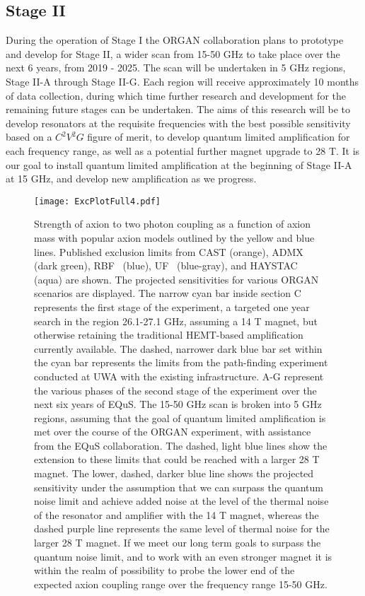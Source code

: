 \documentclass[preprint]{elsarticle}
\begin{document}
\subsection*{Stage II}
During the operation of Stage I the ORGAN collaboration plans to prototype and develop for Stage II, a wider scan from 15-50 GHz to take place over the next 6 years, from 2019 - 2025. The scan will be undertaken in 5 GHz regions, Stage II-A through Stage II-G. Each region will receive approximately 10 months of data collection, during which time further research and development for the remaining future stages can be undertaken.
The aims of this research will be to develop resonators at the requisite frequencies with the best possible sensitivity based on a $C^2V^2G$ figure of merit, to develop quantum limited amplification for each frequency range, as well as a potential further magnet upgrade to 28 T. It is our goal to install quantum limited amplification at the beginning of Stage II-A at 15 GHz, and develop new amplification as we progress.
\begin{figure}[t!]
	\centering
	\texttt{[image: ExcPlotFull4.pdf]}
	\caption{Strength of axion to two photon coupling as a function of axion mass with popular axion models outlined by the yellow and blue lines. Published exclusion limits from CAST (orange), ADMX~\cite{ADMXaxions2010,ADMX2011} (dark green), RBF~\cite{RBF1,RBF2} (blue), UF~\cite{UFaxions} (blue-gray), and HAYSTAC~\cite{YaleAxion} (aqua) are shown. The projected sensitivities for various ORGAN scenarios are displayed. The narrow cyan bar inside section C represents the first stage of the experiment, a targeted one year search in the region 26.1-27.1 GHz, assuming a 14 T magnet, but otherwise retaining the traditional HEMT-based amplification currently available. The dashed, narrower dark blue bar set within the cyan bar represents the limits from the path-finding experiment conducted at UWA with the existing infrastructure. A-G represent the various phases of the second stage of the experiment over the next six years of EQuS. The 15-50 GHz scan is broken into 5 GHz regions, assuming that the goal of quantum limited amplification is met over the course of the ORGAN experiment, with assistance from the EQuS collaboration. The dashed, light blue lines show the extension to these limits that could be reached with a larger 28 T magnet. The lower, dashed, darker blue line shows the projected sensitivity under the assumption that we can surpass the quantum noise limit and achieve added noise at the level of the thermal noise of the resonator and amplifier with the 14 T magnet, whereas the dashed purple line represents the same level of thermal noise for the larger 28 T magnet. If we meet our long term goals to surpass the quantum noise limit, and to work with an even stronger magnet it is within the realm of possibility to probe the lower end of the expected axion coupling range over the frequency range 15-50 GHz.}
	\label{fig:fullplot}
\end{figure}
\end{document}

